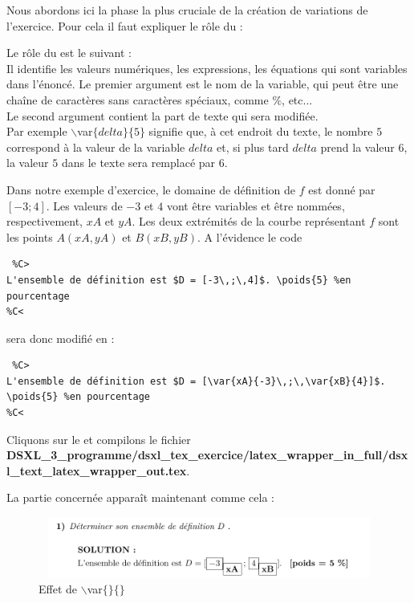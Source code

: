 {Nous abordons ici la phase la plus cruciale de la création de variations de l'exercice. Pour cela il faut expliquer le rôle du  :

\begin{dsxl}
 Le rôle du   est le suivant : \\
Il identifie les valeurs numériques, les expressions, les équations qui sont variables dans l'énoncé. Le premier argument est le nom de la variable, 
  qui peut être une chaîne de caractères sans caractères spéciaux, comme $\%$, etc... \\
  Le second argument contient la part de texte qui sera modifiée. \\
  Par exemple $\backslash$var$\{delta\}\{5\}$ signifie que, à cet endroit du texte, le nombre $5$ correspond à la valeur de la variable $delta$ et, si plus tard $delta$ prend la valeur $6$,
  la valeur $5$ dans le texte sera remplacé par $6$. 

\end{dsxl}

Dans notre exemple d'exercice, le domaine de définition de $f$ est donné par $[-3 ; 4]$. Les valeurs de $-3$ et $4$ vont être variables et être nommées, respectivement, $xA$ et $yA$. 
Les deux extrémités de la courbe représentant $f$ sont les points $A(xA,yA)$ et $B(xB,yB)$. 
A l'évidence le code
\begin{verbatim}
 %C>
L'ensemble de définition est $D = [-3\,;\,4]$. \poids{5} %en pourcentage
%C<
\end{verbatim}
sera donc modifié en :
\begin{verbatim}
 %C>
L'ensemble de définition est $D = [\var{xA}{-3}\,;\,\var{xB}{4}]$. \poids{5} %en pourcentage
%C<
\end{verbatim}

Cliquons sur le  et compilons le fichier \\
{\bf DSXL\_3\_programme/dsxl\_tex\_exercice/latex\_wrapper\_in\_full/dsxl\_text\_latex\_wrapper\_out.tex}.

La partie concernée apparaît maintenant comme cela : 
\begin{figure}[h]
 \centering
 \includegraphics[width=12cm,height=2cm]{./images/creation_exercice_var_01.png}
 \caption{Effet de $\backslash$var$\{\}\{\}$}
 \label{fig: var 01}
\end{figure}

}
